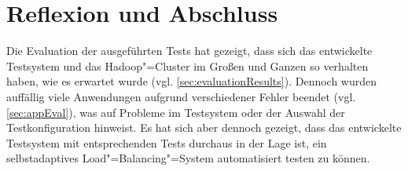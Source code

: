 \chapter{Reflexion und Abschluss}
\label{ch:outro}

Die Evaluation der ausgeführten Tests hat gezeigt, dass sich das entwickelte Testsystem und das Hadoop"=Cluster im Großen und Ganzen so verhalten haben, wie es erwartet wurde (vgl. \cref{sec:evaluationResults}).
Dennoch wurden auffällig viele Anwendungen aufgrund verschiedener Fehler beendet (vgl. \cref{sec:appEval}), was auf Probleme im Testsystem oder der Auswahl der Testkonfiguration hinweist.
Es hat sich aber dennoch gezeigt, dass das entwickelte Testsystem mit entsprechenden Tests durchaus in der Lage ist, ein selbstadaptives Load"=Balancing"=System automatisiert testen zu können.





